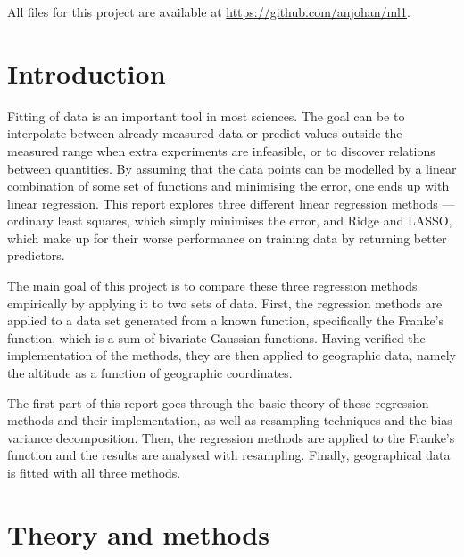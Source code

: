 \documentclass[11pt,british,a4paper]{article}
\numberwithin{equation}{section}
\begin{document}
All files for this project are available at \url{https://github.com/anjohan/ml1}.

\tableofcontents

\section{Introduction}
Fitting of data is an important tool in most sciences.
The goal can be to interpolate between already measured data or predict values outside the measured range when extra experiments are infeasible, or to discover relations between quantities.
By assuming that the data points can be modelled by a linear combination of some set of functions and minimising the error, one ends up with linear regression.
This report explores three different linear regression methods --- ordinary least squares, which simply minimises the error, and Ridge and LASSO, which make up for their worse performance on training data by returning better predictors.

The main goal of this project is to compare these three regression methods empirically by applying it to two sets of data.
First, the regression methods are applied to a data set generated from a known function, specifically the Franke's function, which is a sum of bivariate Gaussian functions.
Having verified the implementation of the methods, they are then applied to geographic data, namely the altitude as a function of geographic coordinates.

The first part of this report goes through the basic theory of these regression methods and their implementation, as well as resampling techniques and the bias-variance decomposition.
Then, the regression methods are applied to the Franke's function and the results are analysed with resampling. Finally, geographical data is fitted with all three methods.

\section{Theory and methods}
\end{document}
